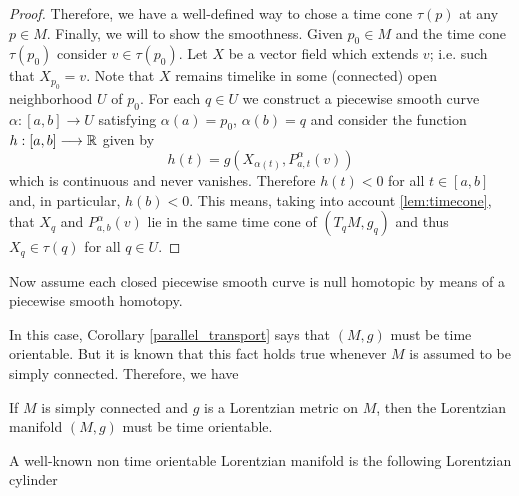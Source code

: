 \begin{proof}
    Therefore, we have a well-defined way to chose a time cone $\tau(p)$ at any $p \in M$. Finally, we will to show the smoothness. Given $p_0 \in M$ and the time cone $\tau(p_0)$ consider $v \in \tau(p_0)$. Let $X$ be a vector field which extends $v$; i.e. such that $X_{p_{0}}=v$. Note that $X$ remains timelike in some (connected) open neighborhood $U$ of $p_0$. For each $q \in U$ we construct a piecewise smooth curve $\alpha : [a,b] \longrightarrow U$ satisfying $\alpha(a)=p_0$,
    $\alpha(b)=q$ and consider the function $h : [a,b] \longrightarrow \mathbb{R}$ given by
    \[
        h(t)=g(X_{\alpha(t)},P_{a,t}^{\alpha}(v))
    \]
    which is continuous and never vanishes. Therefore $h(t)<0$ for all $t\in [a,b]$ and, in particular, $h(b)<0$. This means, taking into account \autoref{lem:timecone}, that $X_q$ and $P_{a,b}^{\alpha}(v)$ lie in the same time cone of $(T_qM,g_q)$ and thus $X_q \in \tau(q)$ for all $q \in U$.
\end{proof}

Now assume each closed piecewise smooth curve is null homotopic by means of a piecewise smooth homotopy.

In this case, Corollary \ref{parallel_transport} says that $(M,g)$ must be time orientable. But it is known that this fact holds true whenever $M$ is assumed to be simply connected. Therefore, we have

\begin{corollary}\label{simply_connected}
    If $M$ is simply connected and $g$ is a Lorentzian metric on $M$, then the Lorentzian manifold $(M,g)$ must be time orientable.
\end{corollary}


A well-known non time orientable Lorentzian manifold is the following Lorentzian cylinder \cite[Example 1.2.3]{sachs77}



